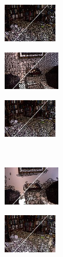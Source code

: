 \begin{figure}
\begin{subfigure}[b]{0.1375\textwidth}
    \end{subfigure}
    \begin{subfigure}[b]{0.129\textwidth}
        \includegraphics[height=1.65cm]{pictures/sunrgbd/etps/cropped/etps_00007477_contours}
    \end{subfigure}
    \begin{subfigure}[b]{0.02\textwidth}
    \end{subfigure}
    \begin{subfigure}[b]{0.1375\textwidth}
        \includegraphics[height=1.65cm]{pictures/nyuv2/lsc/cropped/lsc_00001297_contours}
    \end{subfigure}
    \begin{subfigure}[b]{0.129\textwidth}
        \includegraphics[height=1.65cm]{pictures/sunrgbd/lsc/cropped/lsc_00007477_contours}
    \end{subfigure}\\
    \begin{subfigure}[b]{0.02\textwidth}
    \end{subfigure}
    \begin{subfigure}[b]{0.1375\textwidth}
        \includegraphics[height=1.65cm]{pictures/nyuv2/poise/cropped/poise_00001297_contours}
    \end{subfigure}
    \begin{subfigure}[b]{0.129\textwidth}
        \includegraphics[height=1.65cm]{pictures/sunrgbd/poise/cropped/poise_00007477_contours}

\end{subfigure}
\end{figure}
